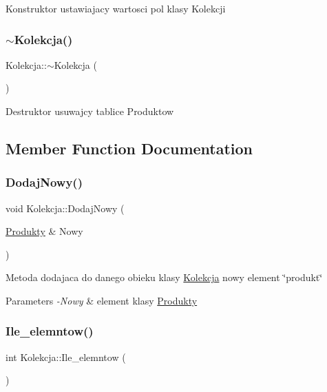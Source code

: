 Konstruktor ustawiajacy wartosci pol klasy Kolekcji \mbox{\label{class_kolekcja_a220be4dda58af7e329be4e3ed51fa0c6}} 
\subsubsection{\texorpdfstring{$\sim$\+Kolekcja()}{~Kolekcja()}}
{\footnotesize\ttfamily Kolekcja\+::$\sim$\+Kolekcja (\begin{DoxyParamCaption}{ }\end{DoxyParamCaption})\hspace{0.3cm}{\ttfamily [inline]}}

Destruktor usuwajcy tablice Produktow 

\subsection{Member Function Documentation}
\mbox{\label{class_kolekcja_adc8b3d342db002a284da4cb28fea9493}} 
\subsubsection{\texorpdfstring{Dodaj\+Nowy()}{DodajNowy()}}
{\footnotesize\ttfamily void Kolekcja\+::\+Dodaj\+Nowy (\begin{DoxyParamCaption}\item[{\mbox{\hyperlink{class_produkty}{Produkty}} \&}]{Nowy }\end{DoxyParamCaption})}

Metoda dodajaca do danego obieku klasy \mbox{\hyperlink{class_kolekcja}{Kolekcja}} nowy element \char`\"{}produkt\char`\"{} 
\begin{DoxyParams}{Parameters}
{\em -\/\+Nowy} & element klasy \mbox{\hyperlink{class_produkty}{Produkty}} \\
\hline
\end{DoxyParams}
\mbox{\label{class_kolekcja_a0da01243a4c06bf82c035054f9cb0954}} 
\subsubsection{\texorpdfstring{Ile\+\_\+elemntow()}{Ile\_elemntow()}}
{\footnotesize\ttfamily int Kolekcja\+::\+Ile\+\_\+elemntow (\begin{DoxyParamCaption}{ }\end{DoxyParamCaption})}

